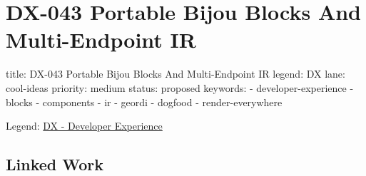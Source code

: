 \chapter{DX-043 Portable Bijou Blocks And Multi-Endpoint IR}\label{record-139}

\smallskip

\begin{RecordMeta}
title: DX-043 Portable Bijou Blocks And Multi-Endpoint IR
legend: DX
lane: cool-ideas
priority: medium
status: proposed
keywords:
  - developer-experience
  - blocks
  - components
  - ir
  - geordi
  - dogfood
  - render-everywhere

\end{RecordMeta}

Legend: \href{https://github.com/flyingrobots/bijou/blob/1853ad902f6bf219326409e7f743a5a1d6517dbc/docs/legends/DX-developer-experience.md}{DX - Developer Experience}

\section{Linked Work}\label{record-139-linked-work}

